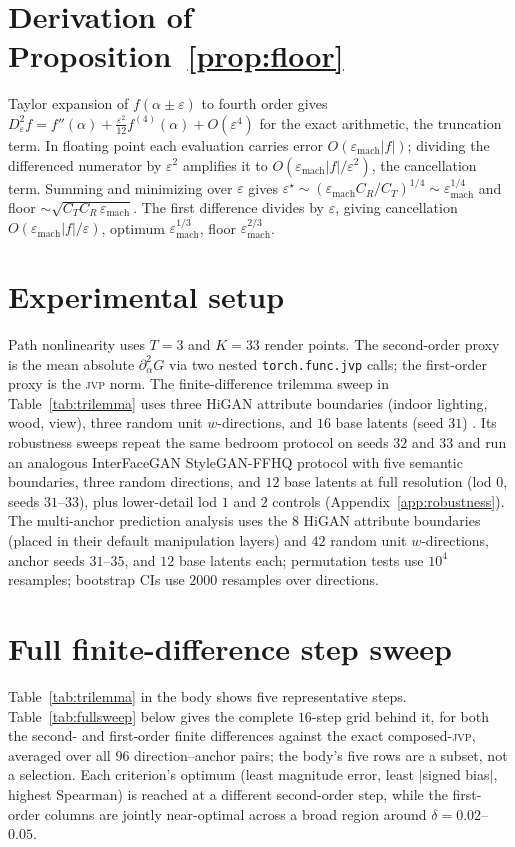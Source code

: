 \documentclass[10pt]{article}
\newcommand{\jvp}{\textsc{jvp}}
\newcommand{\eps}{\varepsilon}
\begin{document}



\newpage
\appendix
\section{Derivation of Proposition~\ref{prop:floor}}
\label{app:deriv}
Taylor expansion of $f(\alpha\pm\eps)$ to fourth order gives $D^2_\eps f = f''(\alpha) +
\tfrac{\eps^2}{12}f^{(4)}(\alpha)+O(\eps^4)$ for the exact arithmetic, the truncation term. In floating
point each evaluation carries error $O(\eps_{\mathrm{mach}}|f|)$; dividing the differenced numerator by
$\eps^2$ amplifies it to $O(\eps_{\mathrm{mach}}|f|/\eps^2)$, the cancellation term. Summing and
minimizing over $\eps$ gives $\eps^\star\sim(\eps_{\mathrm{mach}}C_R/C_T)^{1/4}\sim
\eps_{\mathrm{mach}}^{1/4}$ and floor $\sim\sqrt{C_TC_R\,\eps_{\mathrm{mach}}}$. The first difference
divides by $\eps$, giving cancellation $O(\eps_{\mathrm{mach}}|f|/\eps)$, optimum
$\eps_{\mathrm{mach}}^{1/3}$, floor $\eps_{\mathrm{mach}}^{2/3}$.

\section{Experimental setup}
\label{app:exp}
Path nonlinearity uses $T=3$ and $K=33$ render points. The second-order proxy is the mean absolute
$\partial^2_\alpha G$ via two nested \texttt{torch.func.jvp} calls; the first-order proxy is the \jvp{}
norm. The finite-difference trilemma sweep in Table~\ref{tab:trilemma} uses three HiGAN attribute
boundaries (indoor lighting, wood, view), three random unit $w$-directions, and $16$ base latents
(seed $31$) \citep{yang2020semantic}. Its robustness sweeps repeat the same bedroom protocol on seeds $32$ and $33$ and run an
analogous InterFaceGAN StyleGAN-FFHQ protocol \citep{shen2020} with five semantic boundaries, three random directions,
and $12$ base latents at full resolution (lod $0$, seeds $31$--$33$), plus lower-detail lod $1$ and $2$
controls (Appendix~\ref{app:robustness}). The multi-anchor
prediction analysis uses the $8$ HiGAN attribute boundaries (placed in their default manipulation layers)
and $42$ random unit $w$-directions, anchor seeds $31$--$35$, and $12$ base latents each; permutation tests
use $10^4$ resamples; bootstrap CIs use $2000$ resamples over directions.

\section{Full finite-difference step sweep}
\label{app:trilemma}
Table~\ref{tab:trilemma} in the body shows five representative steps. Table~\ref{tab:fullsweep} below
gives the complete $16$-step grid behind it, for both the second- and first-order finite differences
against the exact composed-\jvp{}, averaged over all $96$ direction--anchor pairs; the body's five rows
are a subset, not a selection. Each criterion's optimum (least magnitude error, least $|$signed bias$|$,
highest Spearman) is reached at a different second-order step, while the first-order columns are jointly
near-optimal across a broad region around $\delta=0.02$--$0.05$.
\end{document}
